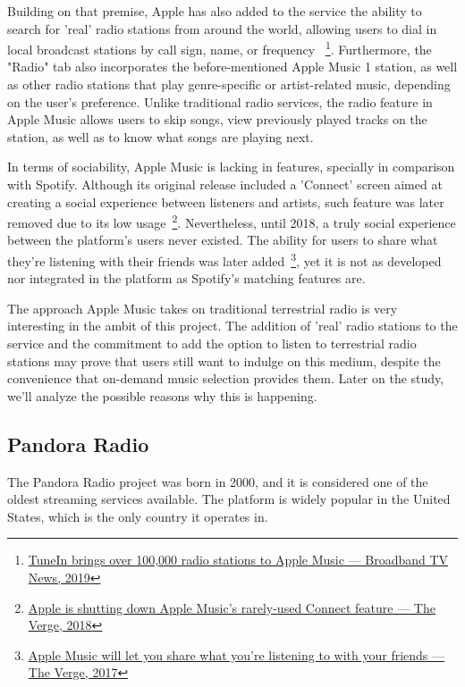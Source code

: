 Building on that premise, Apple has also added to the service the ability to search for 'real' radio stations from around the world, allowing users to dial in local broadcast stations by call sign, name, or frequency ~\footnote{\href{https://www.broadbandtvnews.com/2019/09/25/tunein-brings-over-100000-radio-stations-to-apple-music/}{TuneIn brings over 100,000 radio stations to Apple Music — Broadband TV News, 2019}}. Furthermore, the "Radio" tab also incorporates the before-mentioned Apple Music 1 station, as well as other radio stations that play genre-specific or artist-related music, depending on the user's preference. Unlike traditional radio services, the radio feature in Apple Music allows users to skip songs, view previously played tracks on the station, as well as to know what songs are playing next.

In terms of sociability, Apple Music is lacking in features, specially in comparison with Spotify. Although its original release included a 'Connect' screen aimed at creating a social experience between listeners and artists, such feature was later removed due to its low usage~\footnote{\href{https://www.theverge.com/2018/12/13/18139837/apple-music-connect-social-network-feature-discontinued}{Apple is shutting down Apple Music’s rarely-used Connect feature — The Verge, 2018}}. Nevertheless, until 2018, a truly social experience between the platform's users never existed. The ability for users to share what they're listening with their friends was later added~\footnote{\href{https://www.theverge.com/2017/6/5/15727014/apple-music-app-update-social-features-wwdc-2017}{Apple Music will let you share what you’re listening to with your friends — The Verge, 2017}}, yet it is not as developed nor integrated in the platform as Spotify's matching features are.

The approach Apple Music takes on traditional terrestrial radio is very interesting in the ambit of this project. The addition of 'real' radio stations to the service and the commitment to add the option to listen to terrestrial radio stations may prove that users still want to indulge on this medium, despite the convenience that on-demand music selection provides them. Later on the study, we'll analyze the possible reasons why this is happening.

\subsection{Pandora Radio}

The Pandora Radio project was born in 2000, and it is considered one of the oldest streaming services available. The platform is widely popular in the United States, which is the only country it operates in.


